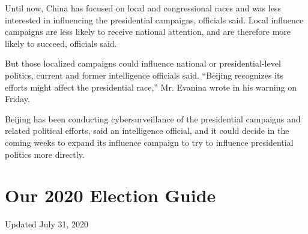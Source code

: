 Until now, China has focused on local and congressional races and was
less interested in influencing the presidential campaigns, officials
said. Local influence campaigns are less likely to receive national
attention, and are therefore more likely to succeed, officials said.

But those localized campaigns could influence national or
presidential-level politics, current and former intelligence officials
said. ``Beijing recognizes its efforts might affect the presidential
race,'' Mr. Evanina wrote in his warning on Friday.

Beijing has been conducting cybersurveillance of the presidential
campaigns and related political efforts, said an intelligence official,
and it could decide in the coming weeks to expand its influence campaign
to try to influence presidential politics more directly.

\hypertarget{our-2020-election-guide}{%
\section{Our 2020 Election Guide}\label{our-2020-election-guide}}

Updated July 31, 2020

